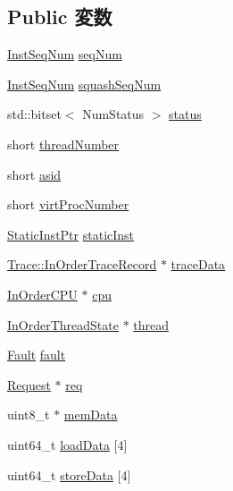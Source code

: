 \subsection*{Public 変数}
\begin{DoxyCompactItemize}
\item 
\hyperlink{inst__seq_8hh_a258d93d98edaedee089435c19ea2ea2e}{InstSeqNum} \hyperlink{classInOrderDynInst_af9da73f56d2d0e7fd5009b70c4cf3542}{seqNum}
\item 
\hyperlink{inst__seq_8hh_a258d93d98edaedee089435c19ea2ea2e}{InstSeqNum} \hyperlink{classInOrderDynInst_a34292b1418c46ca63c892e7826510d77}{squashSeqNum}
\item 
std::bitset$<$ NumStatus $>$ \hyperlink{classInOrderDynInst_aa3a3e4b13899ec096589e2e0c76f25bc}{status}
\item 
short \hyperlink{classInOrderDynInst_ae714c38dca501686b9cb14dad9a009db}{threadNumber}
\item 
short \hyperlink{classInOrderDynInst_a03f3e3cd7500e78001075b53eab05a53}{asid}
\item 
short \hyperlink{classInOrderDynInst_a1f5f5e69ef26bddaea88b672235dbc59}{virtProcNumber}
\item 
\hyperlink{classRefCountingPtr}{StaticInstPtr} \hyperlink{classInOrderDynInst_a6799d48af805bf0bd72441e882589a6a}{staticInst}
\item 
\hyperlink{classTrace_1_1InOrderTraceRecord}{Trace::InOrderTraceRecord} $\ast$ \hyperlink{classInOrderDynInst_ab6afba48e8363686299580a3df05dd43}{traceData}
\item 
\hyperlink{classInOrderCPU}{InOrderCPU} $\ast$ \hyperlink{classInOrderDynInst_a41d682c28d0f49e04393c52815808782}{cpu}
\item 
\hyperlink{classInOrderThreadState}{InOrderThreadState} $\ast$ \hyperlink{classInOrderDynInst_ac297691c06a1cd4769d8eba7822395b9}{thread}
\item 
\hyperlink{classRefCountingPtr}{Fault} \hyperlink{classInOrderDynInst_a68714ceb74c60ea7ef5dec335bb6c5d7}{fault}
\item 
\hyperlink{classRequest}{Request} $\ast$ \hyperlink{classInOrderDynInst_a0baf46c33fa5906d6c21b3fcc0176acf}{req}
\item 
uint8\_\-t $\ast$ \hyperlink{classInOrderDynInst_a9c9a186aff5eddf449916952b8398116}{memData}
\item 
uint64\_\-t \hyperlink{classInOrderDynInst_a3f140b7af15b1d63fd19728f240c7260}{loadData} \mbox{[}4\mbox{]}
\item 
uint64\_\-t \hyperlink{classInOrderDynInst_aa8b3ce2cb083b44a6a713b4e35f566ef}{storeData} \mbox{[}4\mbox{]}

\end{DoxyCompactItemize}
